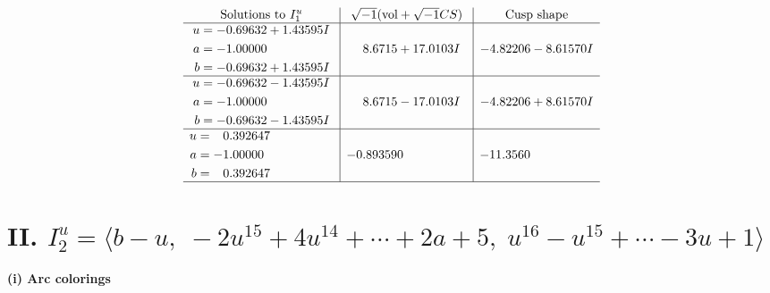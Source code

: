 \documentclass[1p]{elsarticle_modified}
\theoremstyle{definition}
\newcommand{\I}{\sqrt{-1}}
\begin{document}
$$\begin{array}{c|c|c}  
\text{Solutions to }I^u_{1}& \I (\text{vol} + \sqrt{-1}CS) & \text{Cusp shape}\\
 \hline 
\begin{aligned}
u &= -0.69632 + 1.43595 I \\
a &= -1.00000\phantom{ +0.000000I} \\
b &= -0.69632 + 1.43595 I\end{aligned}
 & \phantom{-}8.6715 + 17.0103 I & -4.82206 - 8.61570 I \\ \hline\begin{aligned}
u &= -0.69632 - 1.43595 I \\
a &= -1.00000\phantom{ +0.000000I} \\
b &= -0.69632 - 1.43595 I\end{aligned}
 & \phantom{-}8.6715 - 17.0103 I & -4.82206 + 8.61570 I \\ \hline\begin{aligned}
u &= \phantom{-}0.392647\phantom{ +0.000000I} \\
a &= -1.00000\phantom{ +0.000000I} \\
b &= \phantom{-}0.392647\phantom{ +0.000000I}\end{aligned}
 & -0.893590\phantom{ +0.000000I} & -11.3560\phantom{ +0.000000I}\\
 \hline 
 \end{array}$$\newpage\newpage\renewcommand{\arraystretch}{1}
\centering \section*{II. $I^u_{2}= \langle b- u,\;-2 u^{15}+4 u^{14}+\cdots+2 a+5,\;u^{16}- u^{15}+\cdots-3 u+1 \rangle$}
\flushleft \textbf{(i) Arc colorings}\\
\end{document}
